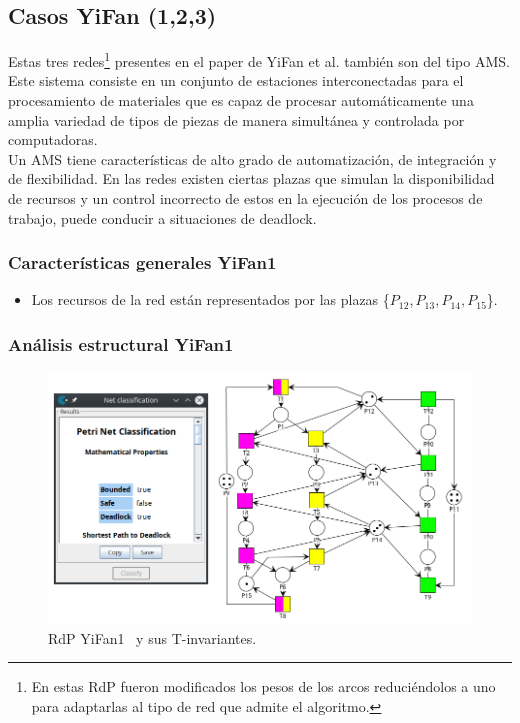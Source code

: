 
\subsection{Casos YiFan (1,2,3) }
Estas tres redes\footnote{En estas RdP fueron modificados los pesos de los arcos reduciéndolos a uno para adaptarlas al tipo de red que admite el algoritmo.} presentes en el paper de YiFan et al. \cite{paperyifanhou} también son del tipo AMS. Este sistema consiste en un conjunto de estaciones interconectadas para el procesamiento de materiales que es capaz de procesar automáticamente una amplia variedad de tipos de piezas de manera simultánea y controlada por computadoras.\\
Un AMS tiene características de alto grado de automatización, de integración y de flexibilidad. 
En las redes existen ciertas plazas que simulan la disponibilidad de recursos y un control incorrecto de estos en la ejecución de los procesos de trabajo, puede conducir a situaciones de deadlock.

\subsubsection{Características generales YiFan1}
\begin{itemize}
    \item Los recursos de la red están representados por las plazas \{$P_{12},P_{13},P_{14}, P_{15}$\}.
\end{itemize}

\subsubsection{Análisis estructural YiFan1}
\hfill
\begin{figure}[H]
	\centering
	\includegraphics[width=\textwidth]{Figures/testing/yifan1_tinvariantes.png}
	\caption[RdP YiFan1 y sus T-invariantes.]{RdP YiFan1 \footnotemark \ y sus T-invariantes.}
	\label{fig:yifan1_invariantes}
 \end{figure} 

